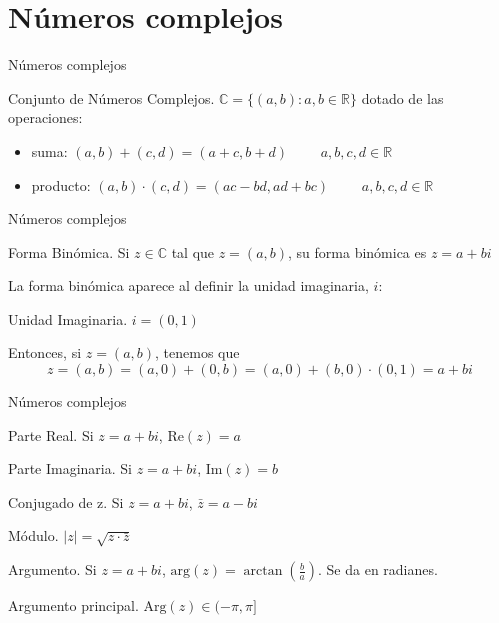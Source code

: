 \documentclass[
  ignorenonframetext,
]{beamer}
\providecommand{\tightlist}{%
  \setlength{\itemsep}{0pt}\setlength{\parskip}{0pt}}
\begin{document}
\hypertarget{nuxfameros-complejos}{%
\section{Números complejos}\label{nuxfameros-complejos}}

\begin{frame}{Números complejos}
\protect\hypertarget{nuxfameros-complejos-1}{}

Conjunto de Números Complejos. \(\mathbb{C}=\{(a,b):a,b\in\mathbb{R}\}\)
dotado de las operaciones:

\begin{itemize}
\tightlist
\item
  suma: \((a,b)+(c,d) = (a+c,b+d)\) \(\qquad a,b,c,d\in\mathbb{R}\)
\item
  producto: \((a,b)\cdot(c,d) = (ac-bd,ad+bc)\)
  \(\qquad a,b,c,d\in\mathbb{R}\)
\end{itemize}

\end{frame}

\begin{frame}{Números complejos}
\protect\hypertarget{nuxfameros-complejos-2}{}

Forma Binómica. Si \(z\in\mathbb{C}\) tal que \(z=(a,b)\), su forma
binómica es \(z=a+bi\)

La forma binómica aparece al definir la unidad imaginaria, \(i\):

Unidad Imaginaria. \(i=(0,1)\)

Entonces, si \(z=(a,b)\), tenemos que
\[z=(a,b)=(a,0)+(0,b)=(a,0)+(b,0)\cdot(0,1)=a+bi\]

\end{frame}

\begin{frame}{Números complejos}
\protect\hypertarget{nuxfameros-complejos-3}{}

Parte Real. Si \(z=a+bi\), Re\((z)=a\)

Parte Imaginaria. Si \(z=a+bi\), Im\((z)=b\)

Conjugado de z. Si \(z=a+bi\), \(\bar{z}=a-bi\)

Módulo. \(|z|=\sqrt{z\cdot\bar{z}}\)

Argumento. Si \(z=a+bi\),
\(\text{arg}(z)=\arctan\left(\frac{b}{a}\right)\). Se da en radianes.

Argumento principal. \(\text{Arg}(z)\in(-\pi,\pi]\)

\end{frame}
\end{document}
